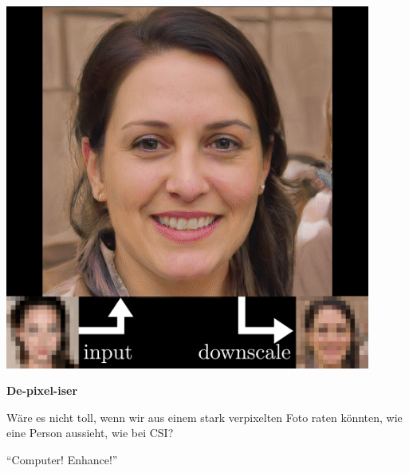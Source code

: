 \documentclass[aspectratio=169,usenames,dvipsnames]{beamer}
\begin{document}
\begin{frame}
\begin{minipage}{.5\textwidth}
\includegraphics[width=0.9\textwidth, keepaspectratio]{images/step1}
\end{minipage}\begin{minipage}{.5\textwidth}
\textbf{De-pixel-iser}
\bigskip

Wäre es nicht toll, wenn wir aus einem stark verpixelten Foto raten könnten, wie eine Person aussieht, wie bei CSI?
\bigskip

``Computer! Enhance!''
\end{minipage}
\end{frame}
\end{document}
